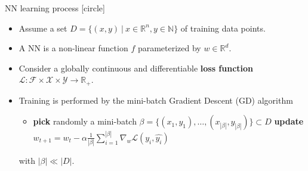 \begin{frame}{NN learning process}
    [circle]
    \begin{itemize}
        \item{Assume a set $D=\{(x,y)\:|\:x\in\mathbb{R}^n,y\in\mathbb{N}\}$ of training data points.}
        \vspace{0.3cm}
        \item{A NN is a non-linear function $f$ parameterized by $w\in\mathbb{R}^d$.}
        \vspace{0.3cm}
        \item{Consider a globally continuous and differentiable \textbf{loss function} $\mathcal{L}:\mathcal{F}\times\mathcal{X}\times\mathcal{Y}\rightarrow\mathbb{R}_+$.}
        \vspace{0.3cm}
        \item{Training is performed by the mini-batch Gradient Descent (GD) algorithm
        \begin{itemize}
            \item[]{
            \begin{algorithm}[H]
                \begin{algorithmic}[1]
                    \STATE \textbf{pick} randomly a mini-batch $\beta=\{(x_1,y_1),\dots,(x_{|\beta|},y_{|\beta|})\} \subset D$
                    \STATE \textbf{update} $w_{t+1}=w_t-\alpha\frac{1}{|\beta|}\sum_{i=1}^{|\beta|}\nabla_w\mathcal{L}(y_i,\hat{y_i})$
                    \ENDWHILE
                \end{algorithmic}
                \label{alg:gd}
            \end{algorithm}
            }
        \end{itemize}
        with $|\beta| \ll |D|$.}
    \end{itemize}
\end{frame}

